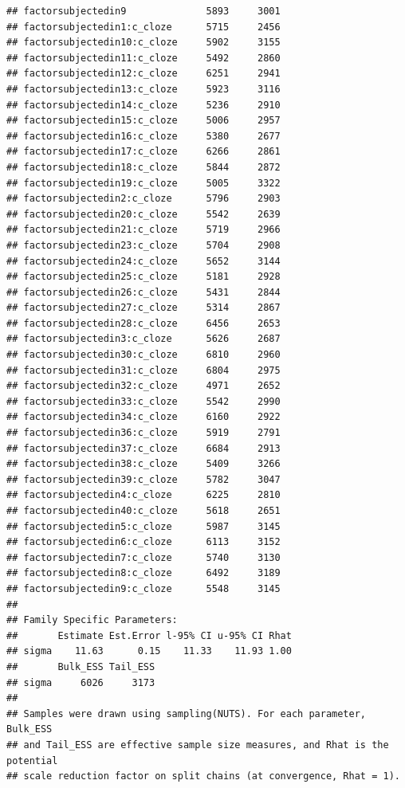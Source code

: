 \documentclass[12pt,ignorenonframetext,aspectratio=169]{beamer}
\begin{document}
\begin{frame}[fragile]
\begin{verbatim}
## factorsubjectedin9              5893     3001
## factorsubjectedin1:c_cloze      5715     2456
## factorsubjectedin10:c_cloze     5902     3155
## factorsubjectedin11:c_cloze     5492     2860
## factorsubjectedin12:c_cloze     6251     2941
## factorsubjectedin13:c_cloze     5923     3116
## factorsubjectedin14:c_cloze     5236     2910
## factorsubjectedin15:c_cloze     5006     2957
## factorsubjectedin16:c_cloze     5380     2677
## factorsubjectedin17:c_cloze     6266     2861
## factorsubjectedin18:c_cloze     5844     2872
## factorsubjectedin19:c_cloze     5005     3322
## factorsubjectedin2:c_cloze      5796     2903
## factorsubjectedin20:c_cloze     5542     2639
## factorsubjectedin21:c_cloze     5719     2966
## factorsubjectedin23:c_cloze     5704     2908
## factorsubjectedin24:c_cloze     5652     3144
## factorsubjectedin25:c_cloze     5181     2928
## factorsubjectedin26:c_cloze     5431     2844
## factorsubjectedin27:c_cloze     5314     2867
## factorsubjectedin28:c_cloze     6456     2653
## factorsubjectedin3:c_cloze      5626     2687
## factorsubjectedin30:c_cloze     6810     2960
## factorsubjectedin31:c_cloze     6804     2975
## factorsubjectedin32:c_cloze     4971     2652
## factorsubjectedin33:c_cloze     5542     2990
## factorsubjectedin34:c_cloze     6160     2922
## factorsubjectedin36:c_cloze     5919     2791
## factorsubjectedin37:c_cloze     6684     2913
## factorsubjectedin38:c_cloze     5409     3266
## factorsubjectedin39:c_cloze     5782     3047
## factorsubjectedin4:c_cloze      6225     2810
## factorsubjectedin40:c_cloze     5618     2651
## factorsubjectedin5:c_cloze      5987     3145
## factorsubjectedin6:c_cloze      6113     3152
## factorsubjectedin7:c_cloze      5740     3130
## factorsubjectedin8:c_cloze      6492     3189
## factorsubjectedin9:c_cloze      5548     3145
## 
## Family Specific Parameters: 
##       Estimate Est.Error l-95% CI u-95% CI Rhat
## sigma    11.63      0.15    11.33    11.93 1.00
##       Bulk_ESS Tail_ESS
## sigma     6026     3173
## 
## Samples were drawn using sampling(NUTS). For each parameter, Bulk_ESS
## and Tail_ESS are effective sample size measures, and Rhat is the potential
## scale reduction factor on split chains (at convergence, Rhat = 1).
\end{verbatim}

\normalsize

\end{frame}
\end{document}

